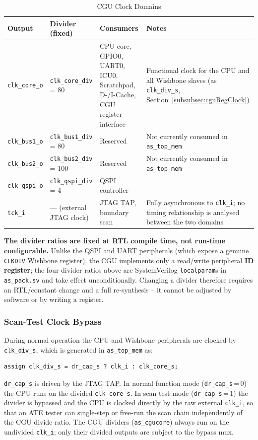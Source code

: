 \begin{table}[H]
\caption{CGU Clock Domains}
\label{tab:asCguDomains}
\centering
\begin{tabularx}{\textwidth}{|l |l |X |X|}
  \hline
  Output & Divider (fixed) & Consumers & Notes \\
  \hline
  \hline
  \texttt{clk\_core\_o} & \texttt{clk\_core\_div} = 80 &
    CPU core, GPIO0, UART0, ICU0, Scratchpad, D-/I-Cache, CGU register interface &
    Functional clock for the CPU and all Wishbone slaves
    (as \texttt{clk\_div\_s}, Section~\ref{subsubsec:cguRegClock}) \\
  \hline
  \texttt{clk\_bus1\_o} & \texttt{clk\_bus1\_div} = 80 & Reserved & Not currently consumed in \texttt{as\_top\_mem} \\
  \hline
  \texttt{clk\_bus2\_o} & \texttt{clk\_bus2\_div} = 100 & Reserved & Not currently consumed in \texttt{as\_top\_mem} \\
  \hline
  \texttt{clk\_qspi\_o} & \texttt{clk\_qspi\_div} = 4 & QSPI controller & \\
  \hline
  \texttt{tck\_i} & --- (external JTAG clock) & JTAG TAP, boundary scan &
    Fully asynchronous to \texttt{clk\_i}; no timing relationship is analysed
    between the two domains \\
  \hline
\end{tabularx}
\end{table}

\textbf{The divider ratios are fixed at RTL compile time, not run-time
configurable.}
Unlike the QSPI and UART peripherals (which expose a genuine \texttt{CLKDIV}
Wishbone register), the CGU implements only a read/write peripheral
\textbf{ID register}; the four divider ratios above are SystemVerilog
\texttt{localparam}s in \texttt{as\_pack.sv} and take effect unconditionally.
Changing a divider therefore requires an RTL/constant change and a full
re-synthesis -- it cannot be adjusted by software or by writing a register.

\subsubsection{Scan-Test Clock Bypass}

During normal operation the CPU and Wishbone peripherals are clocked by
\texttt{clk\_div\_s}, which is generated in \texttt{as\_top\_mem} as:
\begin{verbatim}
assign clk_div_s = dr_cap_s ? clk_i : clk_core_s;
\end{verbatim}
\texttt{dr\_cap\_s} is driven by the JTAG TAP.
In normal function mode (\texttt{dr\_cap\_s}\,=\,0) the CPU runs on the
divided \texttt{clk\_core\_s}.
In scan-test mode (\texttt{dr\_cap\_s}\,=\,1) the divider is bypassed and the
CPU is clocked directly by the raw external \texttt{clk\_i}, so that an ATE
tester can single-step or free-run the scan chain independently of the CGU
divide ratio.
The CGU dividers (\texttt{as\_cgucore}) always run on the undivided
\texttt{clk\_i}; only their divided outputs are subject to the bypass mux.

